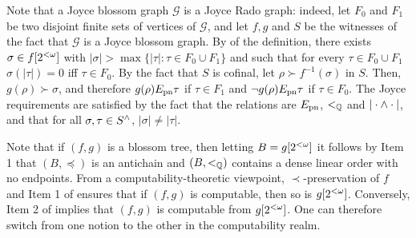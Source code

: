 Note that a Joyce blossom graph $\mathcal{G}$ is a Joyce Rado graph: indeed, let $F_0$ and $F_1$ be two disjoint finite sets of vertices of $\mathcal{G}$, and let $f,g$ and $S$ be the witnesses of the fact that $\mathcal{G}$ is a Joyce blossom graph. By  of the definition, there exists $\sigma\in f[{2^{<\omega}}]$ with $|\sigma|>\max\{|\tau|:\tau\in F_0\cup F_1\}$ and such that for every $\tau\in F_0\cup F_1$ $\sigma(|\tau|)=0$ iff $\tau\in F_0$. By the fact that $S$ is cofinal, let $\rho\succ f^{-1}(\sigma)$ in $S$. Then, $g(\rho)\succ \sigma$, and therefore $g(\rho)E_{\mathrm{pn}}\tau$ if $\tau\in F_1$ and $\lnot g(\rho)E_{\mathrm{pn}}\tau$ if $\tau\in F_0$. The Joyce requirements are satisfied by the fact that the relations are $E_{\mathrm{pn}}$, $<_{\mathbb{Q}}$ and $|\cdot\wedge\cdot|$, and that for all $\sigma,\tau\in{S}^{\wedge}$, $|\sigma|\neq|\tau|$.




Note that if $(f, g)$ is a blossom tree, then letting $B = g[{2^{<\omega}}]$ it follows by Item 1 that 
$(B, \preceq)$ is an antichain and $(B, <_{\mathbb{Q}})$ contains a dense linear order with no endpoints.
From a computability-theoretic viewpoint, $\prec$-preservation of $f$ and Item 1 of    ensures that if $(f, g)$ is computable, then so is $g[{2^{<\omega}}]$. Conversely, Item 2 of  implies that $(f, g)$ is computable from $g[{2^{<\omega}}]$. One can therefore switch from one notion to the other in the computability realm.

